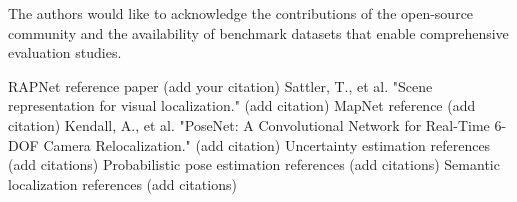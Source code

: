 \documentclass[conference]{IEEEtran}
\begin{document}
The authors would like to acknowledge the contributions of the open-source community and the availability of benchmark datasets that enable comprehensive evaluation studies.

\begin{thebibliography}{00}
 RAPNet reference paper (add your citation)
 Sattler, T., et al. "Scene representation for visual localization." (add citation)
 MapNet reference (add citation)
 Kendall, A., et al. "PoseNet: A Convolutional Network for Real-Time 6-DOF Camera Relocalization." (add citation)
 Uncertainty estimation references (add citations)
 Probabilistic pose estimation references (add citations)
 Semantic localization references (add citations)
\end{thebibliography}
\end{document}
